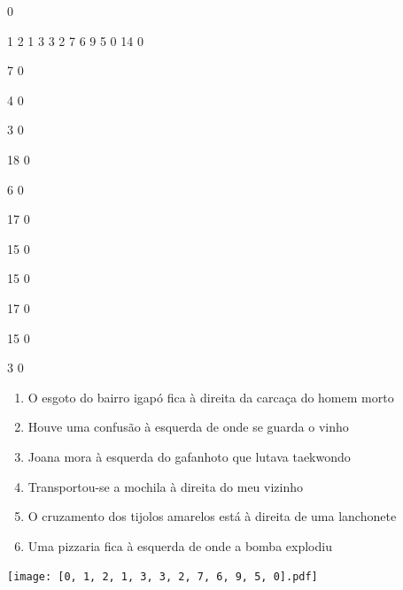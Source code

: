 \documentclass[12pt]{article}
\begin{document}
		\vfill  
		  
{
	0	%

	1	%
	2	%
	1	%
	3	%
	3	%
	2	%
	7	%
	6	%
	9	%
	5	%
	0	%
	14	%
	0	%

	7	%
	0	%

	4	%
	0	%

	3	%
	0	%

	18	%
	0	%

	6	%
	0	%

	17	%
	0	%

	15	%
	0	%

	15	%
	0	%

	17	%
	0	%

	15	%
	0	%

	3	%
	0	%

}	  
		    	

		 

\pagebreak


	\begin{enumerate}
		  \sffamily %
		  \large %


\vfill \item
O esgoto do bairro igapó fica	%
à direita
da carcaça do homem morto	%

\vfill \item
Houve uma confusão	%
à esquerda
de onde se guarda o vinho	%

\vfill \item
Joana mora	%
à esquerda
do gafanhoto que lutava taekwondo	%

\vfill \item
Transportou-se a mochila	%
à direita
do meu vizinho	%

\vfill \item
O cruzamento dos tijolos amarelos está	%
à direita
de uma lanchonete	%

\vfill \item
Uma pizzaria fica	%
à esquerda
de onde a bomba explodiu	%
	\end{enumerate}
		  
		  \hfill

		  \vfill

\texttt{[image: [0, 1, 2, 1, 3, 3, 2, 7, 6, 9, 5, 0].pdf]}
\end{document}
